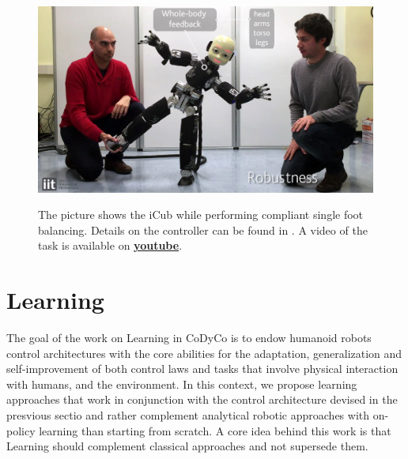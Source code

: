 \documentclass[final,5p,twocolumn]{elsarticle}
\begin{document}
\begin{figure}[h!]
\centering
{\includegraphics[width=\linewidth]{images/single_foot_balancing.jpg}}
\caption{The picture shows the iCub while performing compliant single foot balancing. Details on the controller can be found in \cite{Nori2015a}. A video of the task is available on \href{https://www.youtube.com/watch?v=SYVCbzGsBF4}{\textbf{\underline{youtube}}}.}%
\label{fig:footBalancing}
\end{figure}


\section{Learning}

The goal of the work on Learning in CoDyCo is to endow humanoid robots control architectures with the core abilities for the adaptation, generalization and self-improvement of both control laws and tasks that involve physical interaction with humans, and the environment. In this context, we propose learning approaches that work in conjunction with the control architecture devised in the presvious sectio  and rather complement analytical robotic approaches with on-policy learning than starting from scratch. A core idea behind this work is that Learning should complement classical approaches and not supersede them.

\end{document}
